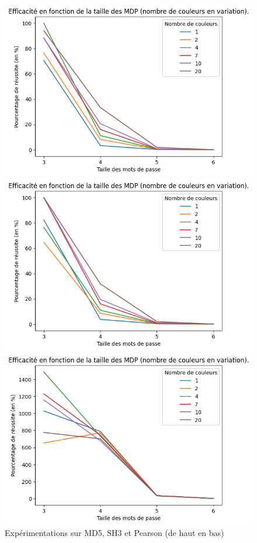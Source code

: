 \documentclass[french,12pt]{article}
\begin{document}
    
     \begin{figure}[H]
                \centering
  
      \includegraphics[scale=0.7]{img/graphe/md5/S_C_T_100000_MotGenerator.png}
  
    
      \includegraphics[scale=0.7]{img/graphe/sha3/S_C_T_100000_MotGenerator.png}

      \includegraphics[scale=0.7]{img/graphe/pearson/S_C_T_100000_MotGenerator.png}
  
    \hspace{0mm}
    
    
    \caption{Expérimentations sur MD5, SH3 et Pearson (de haut en bas)}
    \end{figure}
\end{document}
